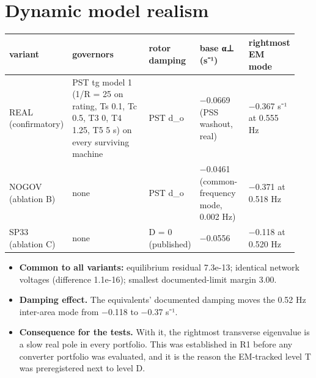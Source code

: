 \documentclass[10pt,a4paper]{article}
\begin{document}
\section{Dynamic model realism}
{\small
\begin{longtable}{L{0.089\linewidth}L{0.475\linewidth}L{0.080\linewidth}L{0.193\linewidth}L{0.103\linewidth}}
\toprule
\textbf{variant} & \textbf{governors} & \textbf{rotor damping} & \textbf{base α⊥ (s⁻¹)} & \textbf{rightmost EM mode} \\
\midrule
\endhead
REAL (confirmatory) & PST tg model 1 (1/R = 25 on rating, Ts 0.1, Tc 0.5, T3 0, T4 1.25, T5 5 s) on every surviving machine & PST d\_o & −0.0669 (PSS washout, real) & −0.367 s⁻¹ at 0.555 Hz \\
NOGOV (ablation B) & none & PST d\_o & −0.0461 (common-frequency mode, 0.002 Hz) & −0.371 at 0.518 Hz \\
SP33 (ablation C) & none & D = 0 (published) & −0.0556 & −0.118 at 0.520 Hz \\
\bottomrule
\end{longtable}}
\begin{itemize}
\item \textbf{Common to all variants:} equilibrium residual 7.3e-13; identical network voltages (difference 1.1e-16); smallest documented-limit margin 3.00.
\item \textbf{Damping effect.} The equivalents' documented damping moves the 0.52 Hz inter-area mode from −0.118 to −0.37 s⁻¹.
\item \textbf{Consequence for the tests.} With it, the rightmost transverse eigenvalue is a slow real pole in every portfolio. This was established in R1 before any converter portfolio was evaluated, and it is the reason the EM-tracked level T was preregistered next to level D.
\end{itemize}
\end{document}
